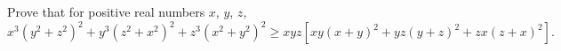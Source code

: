 Prove that for positive real numbers $x$, $y$, $z$, \[ x^3(y^2+z^2)^2 + y^3(z^2+x^2)^2+z^3(x^2+y^2)^2 \geq xyz\left[xy(x+y)^2 + yz(y+z)^2 + zx(z+x)^2\right].\]